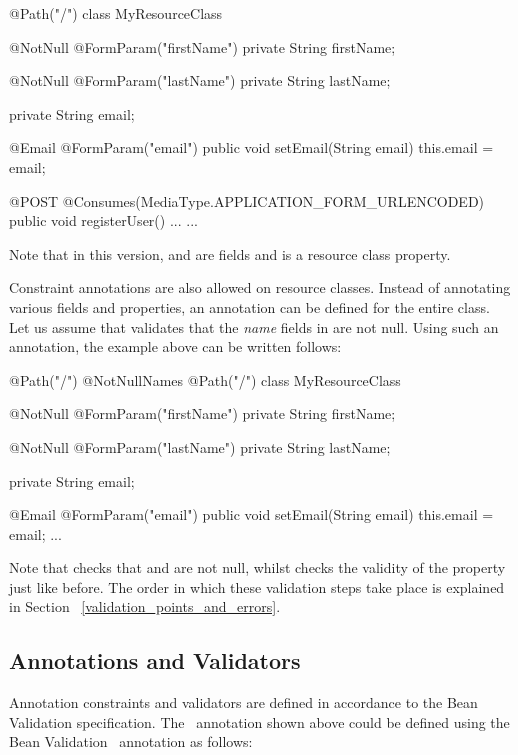 \begin{listing}{1}
@Path("/")
class MyResourceClass {

    @NotNull @FormParam("firstName")
    private String firstName;

    @NotNull @FormParam("lastName")
    private String lastName;

    private String email;

    @Email @FormParam("email")
    public void setEmail(String email) {
        this.email = email;
    }

    @POST
    @Consumes(MediaType.APPLICATION_FORM_URLENCODED)
    public void registerUser() {
        ...
    }
    ...
}
\end{listing}

Note that in this version,  and  are fields and  is a resource class property.

Constraint annotations are also allowed on resource classes. Instead of annotating various fields and properties, an annotation can be defined for the entire class. Let us assume that  validates that the \emph{name} fields in  are not null. Using such an annotation, the example above can be written follows:

\begin{listing}{1}
@Path("/")
@NotNullNames
@Path("/")
class MyResourceClass {

    @NotNull @FormParam("firstName")
    private String firstName;

    @NotNull @FormParam("lastName")
    private String lastName;

    private String email;

    @Email @FormParam("email")
    public void setEmail(String email) {
        this.email = email;
    }
    ...
}
\end{listing}

Note that  checks that  and  are not null, whilst  checks the validity of the  property just like before. The order in which these validation steps take place is explained in Section ~\ref{validation_points_and_errors}.

\subsection{Annotations and Validators}

Annotation constraints and validators are defined in accordance to the Bean Validation specification. The \Email\ annotation shown above could be defined using the Bean Validation \Constraint\ annotation as follows:

